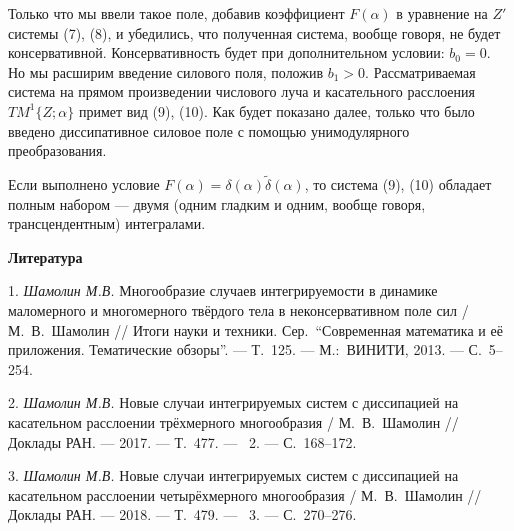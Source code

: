 Только что мы ввели такое поле, добавив коэффициент $F(\alpha)$ в
уравнение на $Z'$ системы (7), (8), и убедились, что полученная
система, вообще говоря, не будет консервативной. Консервативность
будет при дополнительном условии: $b_0=0$. Но мы расширим введение
силового поля, положив $b_1>0$. Рассматриваемая система на прямом
произведении числового луча и касательного расслоения
$TM^1\{Z;\alpha\}$ примет вид (9), (10). Как будет показано далее,
только что было введено диссипативное силовое поле с помощью
унимодулярного преобразования.

Если выполнено условие
$F(\alpha)=\delta(\alpha)\tilde{\delta}(\alpha)$, то система (9),
(10) обладает полным набором
--- двумя (одним гладким и одним, вообще говоря, трансцендентным)
интегралами.



\smallskip \centerline {\bf Литература} \nopagebreak

1. {\it Шамолин М.В.} Многообразие случаев интегрируемости в динамике
маломерного и многомерного твёрдого тела в неконсервативном поле сил
/ М.~В.~Шамолин // Итоги науки и техники. Сер.~``Современная
математика и её приложения. Тематические обзоры''. --- Т.~125. ---
М.:~ВИНИТИ, 2013. --- С.~5--254.

2. {\it Шамолин М.В.} Новые случаи интегрируемых систем с диссипацией на
касательном расслоении трёхмерного многообразия / М.~В.~Шамолин //
Доклады РАН. --- 2017. --- Т.~477. --- \No~2. --- С.~168--172.

3. {\it Шамолин М.В.} Новые случаи интегрируемых систем с диссипацией на
касательном расслоении четырёхмерного многообразия / М.~В.~Шамолин
// Доклады РАН. --- 2018. --- Т.~479. --- \No~3. --- С.~270--276.


